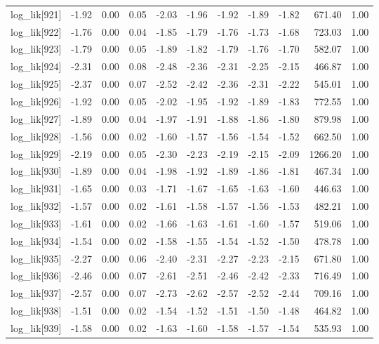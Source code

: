 \begin{table}[ht]
\begin{tabular}{rrrrrrrrrrr}
  log\_lik[921] & -1.92 & 0.00 & 0.05 & -2.03 & -1.96 & -1.92 & -1.89 & -1.82 & 671.40 & 1.00 \\ 
  log\_lik[922] & -1.76 & 0.00 & 0.04 & -1.85 & -1.79 & -1.76 & -1.73 & -1.68 & 723.03 & 1.00 \\ 
  log\_lik[923] & -1.79 & 0.00 & 0.05 & -1.89 & -1.82 & -1.79 & -1.76 & -1.70 & 582.07 & 1.00 \\ 
  log\_lik[924] & -2.31 & 0.00 & 0.08 & -2.48 & -2.36 & -2.31 & -2.25 & -2.15 & 466.87 & 1.00 \\ 
  log\_lik[925] & -2.37 & 0.00 & 0.07 & -2.52 & -2.42 & -2.36 & -2.31 & -2.22 & 545.01 & 1.00 \\ 
  log\_lik[926] & -1.92 & 0.00 & 0.05 & -2.02 & -1.95 & -1.92 & -1.89 & -1.83 & 772.55 & 1.00 \\ 
  log\_lik[927] & -1.89 & 0.00 & 0.04 & -1.97 & -1.91 & -1.88 & -1.86 & -1.80 & 879.98 & 1.00 \\ 
  log\_lik[928] & -1.56 & 0.00 & 0.02 & -1.60 & -1.57 & -1.56 & -1.54 & -1.52 & 662.50 & 1.00 \\ 
  log\_lik[929] & -2.19 & 0.00 & 0.05 & -2.30 & -2.23 & -2.19 & -2.15 & -2.09 & 1266.20 & 1.00 \\ 
  log\_lik[930] & -1.89 & 0.00 & 0.04 & -1.98 & -1.92 & -1.89 & -1.86 & -1.81 & 467.34 & 1.00 \\ 
  log\_lik[931] & -1.65 & 0.00 & 0.03 & -1.71 & -1.67 & -1.65 & -1.63 & -1.60 & 446.63 & 1.00 \\ 
  log\_lik[932] & -1.57 & 0.00 & 0.02 & -1.61 & -1.58 & -1.57 & -1.56 & -1.53 & 482.21 & 1.00 \\ 
  log\_lik[933] & -1.61 & 0.00 & 0.02 & -1.66 & -1.63 & -1.61 & -1.60 & -1.57 & 519.06 & 1.00 \\ 
  log\_lik[934] & -1.54 & 0.00 & 0.02 & -1.58 & -1.55 & -1.54 & -1.52 & -1.50 & 478.78 & 1.00 \\ 
  log\_lik[935] & -2.27 & 0.00 & 0.06 & -2.40 & -2.31 & -2.27 & -2.23 & -2.15 & 671.80 & 1.00 \\ 
  log\_lik[936] & -2.46 & 0.00 & 0.07 & -2.61 & -2.51 & -2.46 & -2.42 & -2.33 & 716.49 & 1.00 \\ 
  log\_lik[937] & -2.57 & 0.00 & 0.07 & -2.73 & -2.62 & -2.57 & -2.52 & -2.44 & 709.16 & 1.00 \\ 
  log\_lik[938] & -1.51 & 0.00 & 0.02 & -1.54 & -1.52 & -1.51 & -1.50 & -1.48 & 464.82 & 1.00 \\ 
  log\_lik[939] & -1.58 & 0.00 & 0.02 & -1.63 & -1.60 & -1.58 & -1.57 & -1.54 & 535.93 & 1.00 \\ 

\end{tabular}
\end{table}
